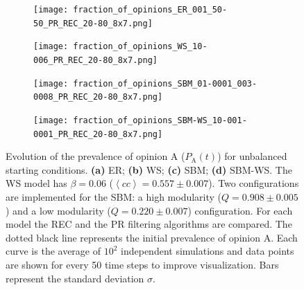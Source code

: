 \documentclass[11 pt , letterpaper , twoside , openright]{book}
\begin{document}
\begin{figure}[H]
  \begin{subfigure}[t]{0.49\textwidth}
    \subcaption{}
  	\texttt{[image: fraction\_of\_opinions\_ER\_001\_50-50\_PR\_REC\_20-80\_8x7.png]}
      \end{subfigure}
  \begin{subfigure}[t]{0.49\textwidth}
    \subcaption{}
  	\texttt{[image: fraction\_of\_opinions\_WS\_10-006\_PR\_REC\_20-80\_8x7.png]}
    \label{ws_20-80_op}
  \end{subfigure}
  \begin{subfigure}[t]{0.49\textwidth}    
    \subcaption{}
    \texttt{[image: fraction\_of\_opinions\_SBM\_01-0001\_003-0008\_PR\_REC\_20-80\_8x7.png]}
  \end{subfigure}
  \begin{subfigure}[t]{0.49\textwidth}
    \subcaption{}
    \texttt{[image: fraction\_of\_opinions\_SBM-WS\_10-001-0001\_PR\_REC\_20-80\_8x7.png]}
    \label{sbm-ws_20-80_op}
  \end{subfigure}
  \captionsetup{format=plain}
  \caption[Evolution of the prevalence of opinion A ($P_\text{A}(t)$) for unbalanced starting conditions.]{Evolution of the prevalence of opinion A ($P_\text{A}(t)$) for unbalanced starting conditions. \textbf{(a)} ER; \textbf{(b)} WS; \textbf{(c)} SBM; \textbf{(d)} SBM-WS. The WS model has $\beta = 0.06$ ($\left<cc\right> = 0.557 \pm 0.007$). Two configurations are implemented for the SBM: a high modularity ($Q = 0.908 \pm 0.005$) and a low modularity ($Q = 0.220 \pm 0.007$) configuration. For each model the REC and the PR filtering algorithms are compared. The dotted black line represents the initial prevalence of opinion A. Each curve is the average of $10^2$ independent simulations and data points are shown for every 50 time steps to improve visualization. Bars represent the standard deviation $\sigma$.}
\label{ev_op_20_80}
\end{figure}
\noindent
\end{document}

